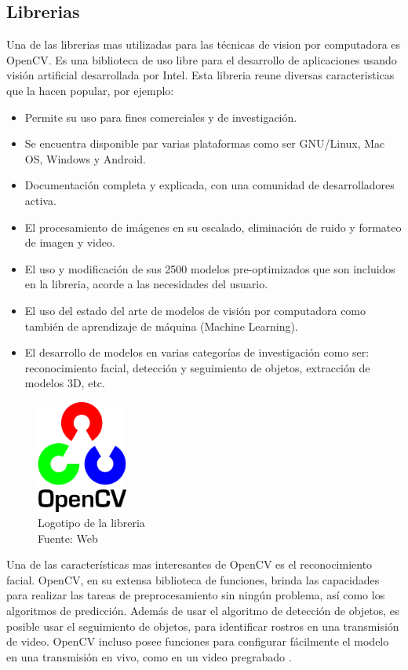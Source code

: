 \subsection{Librerias}
Una de las librerias mas utilizadas para las técnicas de vision por computadora es OpenCV. Es una biblioteca de uso libre para el desarrollo de aplicaciones usando visión artificial desarrollada por Intel. Esta libreria reune diversas caracteristicas que la hacen popular, por ejemplo: 
\begin{itemize}
    \item Permite su uso para fines comerciales y de investigación.
    \item Se encuentra disponible par varias plataformas como ser GNU/Linux, Mac OS, Windows y Android.
    \item Documentación completa y explicada, con una comunidad de desarrolladores activa.
    \item El procesamiento de imágenes en su escalado, eliminación de ruido y formateo de imagen y video.
    \item El uso y modificación de sus 2500 modelos pre-optimizados que son incluidos en la libreria, acorde a las necesidades del usuario.
    \item El uso del estado del arte de modelos de visión por computadora como también de aprendizaje de máquina (Machine Learning).
    \item El desarrollo de modelos en varias categorías de investigación como ser: reconocimiento facial, detección y seguimiento de objetos, extracción de modelos 3D, etc.
\end{itemize}

\begin{figure}[H]
    \begin{center}
        \includegraphics[width=3cm]{img/capitulo_2/cv2_logo.png}
    \end{center}
    \caption{Logotipo de la libreria\\Fuente: Web}
    \label{fig:cv2_logo}
\end{figure}

Una de las características mas interesantes de OpenCV es el reconocimiento facial. OpenCV, en su extensa biblioteca de funciones, brinda las capacidades para realizar las tareas de preprocesamiento sin ningún problema, así como los algoritmos de predicción. Además de usar el algoritmo de detección de objetos, es posible usar el seguimiento de objetos, para identificar rostros en una transmisión de video. OpenCV incluso posee funciones para configurar fácilmente el modelo en una transmisión en vivo, como en un video pregrabado \cite{medium:opencv}. 

